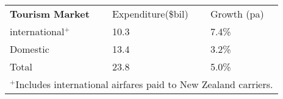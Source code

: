 \begin{tabular}[t]{p{5cm}p{1.3cm}p{1.2cm}}
 \textbf{Tourism Market} & Expenditure(\$bil) & Growth (pa) \\ 
 international$^+$ & 10.3 & 7.4\% \\ 
  Domestic & 13.4 & 3.2\% \\ 
  Total & 23.8 & 5.0\% \\ 
  \multicolumn{3}{p{7.5cm}}{$^+$Includes international airfares paid to New Zealand carriers.}\ 
\end{tabular}

